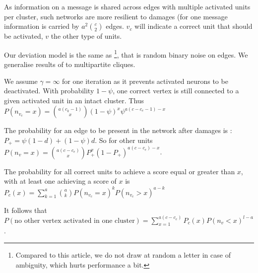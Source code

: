 \documentclass[english,10pt,twocolumn]{IEEEtran}
\renewcommand{\ge}{\geqslant}
\theoremstyle{definition}
\begin{document}
	As information on a message is shared across edges with multiple activated units per cluster, such networks are more resilient to damages (for one message information is carried by $a^2 {c \choose 2}$ edges. $v_c$ will indicate a correct unit that should be activated, $v$ the other type of units.
	
	Our deviation model is the same as \cite{LedGriRabGro20145}\footnote{Compared to this article, we do not draw at random a letter in case of ambiguity, which hurts performance a bit.}, that is random binary noise on edges. We generalise results of \cite{LedGriRabGro20145} to multipartite cliques.
	
	We assume $\gamma = \infty$ for one iteration as it prevents activated neurons to be deactivated.
	With probability $1 - \psi$, one correct vertex is still connected to a given activated unit in an intact cluster. Thus $P(n_{v_c} = x ) = {a (c_k-1) \choose x} (1-\psi)^{x} \psi ^ { a (c - c_e -1) - x }$	
	
	
	The probability for an edge to be present in the network after damages is : $P_+ = \psi (1 - d) + (1 - \psi) d$. So for other units $P(n_v = x) = {a (c - c_e) \choose x} P_+^x (1-P_+)^{a (c - c_e) -x }$.
	
%	
	
	
	The probability for all correct units to achieve a score equal or greater than $x$, with at least one achieving a score of $x$ is $P_c (x) =\sum_{k = 1}^{a} { a \choose k }   P(n_{v_c} = x)^k P(n_{v_c} > x)^{a-k} $

	It follows that $P(\mbox{no other vertex activated in one cluster})= \sum_{x = 1}^{a (c - c_e)} P_c(x) P(n_v < x)^{l-a}$.%
	
\end{document}

